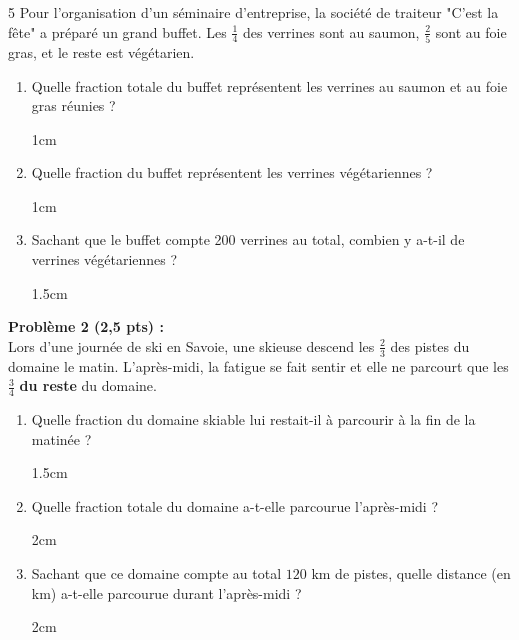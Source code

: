 \documentclass[a4paper]{book}
\begin{document}
{    
    \begin{exerciceNote}{5}       
        Pour l'organisation d'un séminaire d'entreprise, la société de traiteur "C'est la fête" a préparé un grand buffet. Les $\frac{1}{4}$ des verrines sont au saumon, $\frac{2}{5}$ sont au foie gras, et le reste est végétarien.
        \begin{enumerate}
            \item Quelle fraction totale du buffet représentent les verrines au saumon et au foie gras réunies ?
            \begin{ZoneReponse}{1cm}
            \end{ZoneReponse}
            
            \item Quelle fraction du buffet représentent les verrines végétariennes ? 
            \begin{ZoneReponse}{1cm}
            \end{ZoneReponse}
            
            \item Sachant que le buffet compte 200 verrines au total, combien y a-t-il de verrines végétariennes ?
            \begin{ZoneReponse}{1.5cm}
            \end{ZoneReponse}
        \end{enumerate}
    
        \medskip
        
        \textbf{Problème 2 (2,5 pts) :}\\
        Lors d'une journée de ski en Savoie, une skieuse descend les $\frac{2}{3}$ des pistes du domaine le matin. L'après-midi, la fatigue se fait sentir et elle ne parcourt que les $\frac{3}{4}$ \textbf{du reste} du domaine.
        \begin{enumerate}
            \item Quelle fraction du domaine skiable lui restait-il à parcourir à la fin de la matinée ? 
            \begin{ZoneReponse}{1.5cm}
            \end{ZoneReponse}
            
            \item Quelle fraction totale du domaine a-t-elle parcourue l'après-midi ? 
            \begin{ZoneReponse}{2cm}
            \end{ZoneReponse}
            
            \item Sachant que ce domaine compte au total $120\text{ km}$ de pistes, quelle distance (en km) a-t-elle parcourue durant l'après-midi ?
            \begin{ZoneReponse}{2cm}
            \end{ZoneReponse}
        \end{enumerate}
    \end{exerciceNote}
    

}
\end{document}

